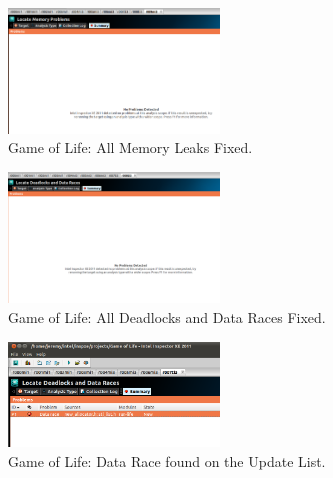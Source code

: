 \documentclass[journal,10pt,onecolumn,draftcls]{IEEEtran}
\begin{document}
%


\begin{figure}[htb]
\label{fig:inspector_clean_memory}
\begin{center}
\includegraphics[width=0.5\textwidth]{figures/ChangeSet14_Memory.png}
\caption{Game of Life: All Memory Leaks Fixed.}
\end{center}
\end{figure}

\begin{figure}[htb]
\label{fig:inspector_clean_deadlocks}
\begin{center}
\includegraphics[width=0.5\textwidth]{figures/ChangeSet14.png}
\caption{Game of Life: All Deadlocks and Data Races Fixed.}
\end{center}
\end{figure}

\begin{figure}[htb]
\label{fig:inspector_data_race_allocator}
\begin{center}
\includegraphics[width=0.5\textwidth]{figures/Data_Race_Anaylsis.png}
\caption{Game of Life: Data Race found on the Update List.}
\end{center}
\end{figure}
\end{document}
